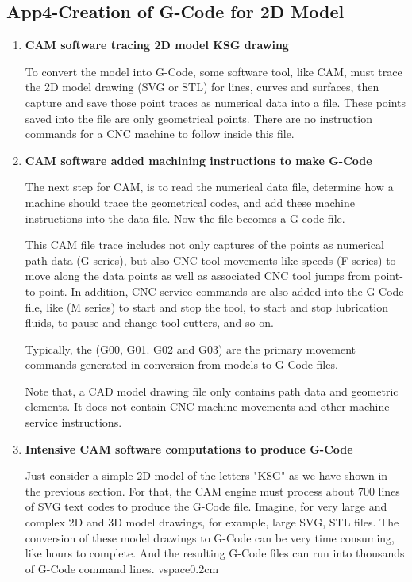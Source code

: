 
\subsection{App4-Creation of G-Code for 2D Model}\label{sec:App4-Creation of G-Code for 2D Model}

\begin{enumerate}
	
\item \textbf{CAM software tracing 2D model KSG drawing}

To convert the model into G-Code, some software tool, like CAM, must trace the 2D model drawing (SVG or STL) for lines, curves and surfaces, then capture and save those point traces as numerical data into a file. These points saved into the file are only geometrical points. There are no instruction commands for a CNC machine to follow inside this file.

\item \textbf{CAM software added machining instructions to make G-Code}

The next step for CAM, is to read the numerical data file, determine how a machine should trace the geometrical codes, and add these machine instructions into the data file. Now the file becomes a G-code file. 

This CAM file trace includes not only captures of the points as numerical path data (G series), but also CNC tool movements like speeds (F series) to move along the data points as well as associated CNC tool jumps from point-to-point. In addition, CNC service commands are also added into the G-Code file, like (M series) to start and stop the tool, to start and stop lubrication fluids, to pause and change tool cutters, and so on. 
 
Typically, the (G00, G01. G02 and G03) are the primary movement commands generated in conversion from models to G-Code files.

Note that, a CAD model drawing file only contains path data and geometric elements. It does not contain CNC machine movements and other machine service instructions.
 
\item \textbf{Intensive CAM software computations to produce G-Code}

Just consider a simple 2D model of the letters "KSG" as we have shown in the previous section. For that, the CAM engine must process about 700 lines of SVG text codes to produce the G-Code file. Imagine, for very large and complex 2D and 3D model drawings, for example, large SVG, STL files. The conversion of these model drawings to G-Code can be very time consuming, like hours to complete. And the resulting G-Code files can run into thousands of G-Code command lines. 
vspace{0.2cm}


\end{enumerate}
